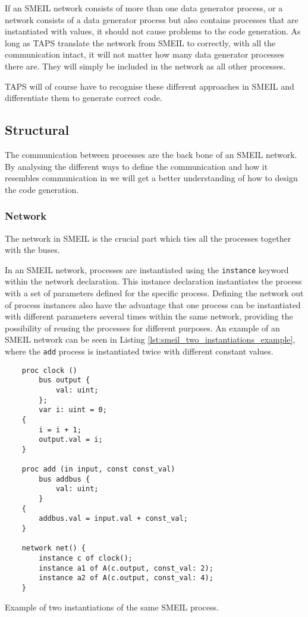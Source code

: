 If an SMEIL network consists of more than one data generator process, or a network consists of a data generator process but also contains processes that are instantiated with values, it should not cause problems to the \cspm{} code generation. As long as TAPS translate the network from SMEIL to \cspm{} correctly, with all the communication intact, it will not matter how many data generator processes there are. They will simply be included in the network as all other processes.

TAPS will of course have to recognise these different approaches in SMEIL and differentiate them to generate correct \cspm{} code.

\subsection{Structural}
\label{sec:analysis_structural}
The communication between processes are the back bone of an SMEIL network. By analysing the different ways to define the communication and how it resembles communication in \cspm{} we will get a better understanding of how to design the code generation.
\subsubsection{Network}
The network in SMEIL is the crucial part which ties all the processes together with the buses.

In an SMEIL network, processes are instantiated using the \texttt{instance} keyword within the network declaration. This instance declaration instantiates the process with a set of parameters defined for the specific process.
Defining the network out of process instances also have the advantage that one process can be instantiated with different parameters several times within the same network, providing the possibility of reusing the processes for different purposes.
An example of an SMEIL network can be seen in Listing \ref{lst:smeil_two_instantiations_example}, where the \texttt{add} process is instantiated twice with different constant values.
\begin{listing}
    \begin{verbatim}
    proc clock ()
        bus output {
            val: uint;
        };
        var i: uint = 0;
    {
        i = i + 1;
        output.val = i;
    }

    proc add (in input, const const_val)
        bus addbus {
            val: uint;
        }
    {
        addbus.val = input.val + const_val;
    }

    network net() {
        instance c of clock();
        instance a1 of A(c.output, const_val: 2);
        instance a2 of A(c.output, const_val: 4);
    }
    \end{verbatim}
    \caption{Example of two instantiations of the same SMEIL process.}
    \label{lst:smeil_two_instantiations_example}
\end{listing}

